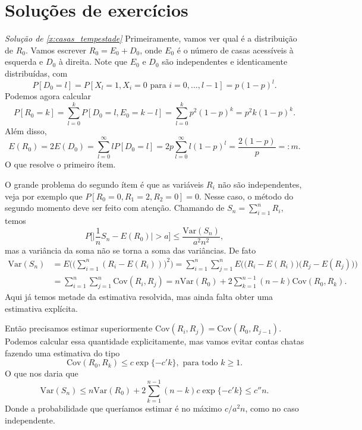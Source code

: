 \chapter{Soluções de exercícios}

\emph{Solução de \ref{x:casas_tempestade}}
Primeiramente, vamos ver qual é a distribuição de $R_0$.
Vamos escrever $R_0 = E_0 + D_0$, onde $E_0$ é o número de casas acessíveis à esquerda e $D_0$ à direita.
Note que $E_0$ e $D_0$ são independentes e identicamente distribuídas, com
\begin{equation}
  P[D_0 = l] = P[X_l = 1, X_i = 0 \text{ para $i = 0, \dots, l-1$}] = p (1-p)^l.
\end{equation}
Podemos agora calcular
\begin{equation}
  P[R_0 = k] = \sum_{l=0}^k P[D_0 = l, E_0 = k-l] = \sum_{l=0}^k p^2 (1-p)^{k} = p^2 k (1-p)^k.
\end{equation}
Além disso,
\begin{equation}
  E(R_0) = 2 E(D_0) = \sum_{l=0}^\infty l P[D_0 = l] = 2 p \sum_{l=0}^\infty l (1-p)^l = \frac{2(1-p)}{p} =: m.
\end{equation}
O que resolve o primeiro ítem.

O grande problema do segundo ítem é que as variáveis $R_i$ não são independentes, veja por exemplo que $P[R_0=0,R_1=2,R_2=0] = 0$.
Nesse caso, o método do segundo momento deve ser feito com atenção.
Chamando de $S_n = \sum_{i=1}^n R_i$, temos
\begin{equation}
  P \Big[ \Big| \frac{1}{n} S_n - E(R_0) \Big| > a \Big] \leq \frac{\text{Var}(S_n)}{a^2 n^2},
\end{equation}
mas a variância da soma não se torna a soma das variâncias.
De fato
\begin{equation}
  \begin{split}
    \text{Var}(S_n) & = E \Big( \big(\sum_{i=1}^n (R_i - E(R_i)) \big)^2\Big) = \sum_{i=1}^n \sum_{j=1}^n E \Big(\big(R_i - E(R_i)\big) \big(R_j - E(R_j) \big)\Big)\\
    & = \sum_{i=1}^n \sum_{j=1}^n \text{Cov}(R_i, R_j) = n \text{Var}(R_0) + 2 \sum_{k=1}^{n-1} (n-k) \text{Cov}(R_0, R_k).
  \end{split}
\end{equation}
Aqui já temos metade da estimativa resolvida, mas ainda falta obter uma estimativa explícita.

Então precisamos estimar superiormente $\text{Cov}(R_i, R_j) = \text{Cov}(R_0, R_{j-1})$.
Podemos calcular essa quantidade explicitamente, mas vamos evitar contas chatas fazendo uma estimativa do tipo
\begin{equation}
  \text{Cov}(R_0, R_k) \leq c \exp\{-c' k\}, \text{ para todo $k \geq 1$}.
\end{equation}
O que nos daria que
\begin{equation}
  \text{Var}(S_n) \leq n \text{Var}(R_0) + 2 \sum_{k=1}^{n-1} (n-k) c \exp\{-c' k\} \leq c'' n.
\end{equation}
Donde a probabilidade que queríamos estimar é no máximo ${c}/{a^2 n}$, como no caso independente.

